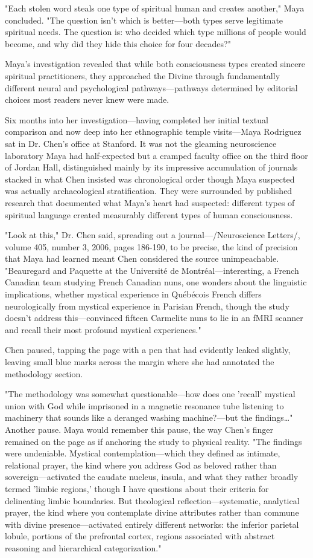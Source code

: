 \documentclass[12pt,twoside]{book}
\begin{document}
"Each stolen word steals one type of spiritual human and creates another," Maya concluded. "The question isn't which is better—both types serve legitimate spiritual needs. The question is: who decided which type millions of people would become, and why did they hide this choice for four decades?"

Maya's investigation revealed that while both consciousness types created sincere spiritual practitioners, they approached the Divine through fundamentally different neural and psychological pathways—pathways determined by editorial choices most readers never knew were made.

Six months into her investigation—having completed her initial textual comparison and now deep into her ethnographic temple visits—Maya Rodriguez sat in Dr. Chen's office at Stanford. It was not the gleaming neuroscience laboratory Maya had half-expected but a cramped faculty office on the third floor of Jordan Hall, distinguished mainly by its impressive accumulation of journals stacked in what Chen insisted was chronological order though Maya suspected was actually archaeological stratification. They were surrounded by published research that documented what Maya's heart had suspected: different types of spiritual language created measurably different types of human consciousness.

"Look at this," Dr. Chen said, spreading out a journal—/Neuroscience Letters/, volume 405, number 3, 2006, pages 186-190, to be precise, the kind of precision that Maya had learned meant Chen considered the source unimpeachable. "Beauregard and Paquette at the Université de Montréal—interesting, a French Canadian team studying French Canadian nuns, one wonders about the linguistic implications, whether mystical experience in Québécois French differs neurologically from mystical experience in Parisian French, though the study doesn't address this—convinced fifteen Carmelite nuns to lie in an fMRI scanner and recall their most profound mystical experiences."

Chen paused, tapping the page with a pen that had evidently leaked slightly, leaving small blue marks across the margin where she had annotated the methodology section.

"The methodology was somewhat questionable—how does one 'recall' mystical union with God while imprisoned in a magnetic resonance tube listening to machinery that sounds like a deranged washing machine?—but the findings\ldots{}" Another pause. Maya would remember this pause, the way Chen's finger remained on the page as if anchoring the study to physical reality. "The findings were undeniable. Mystical contemplation—which they defined as intimate, relational prayer, the kind where you address God as beloved rather than sovereign—activated the caudate nucleus, insula, and what they rather broadly termed 'limbic regions,' though I have questions about their criteria for delineating limbic boundaries. But theological reflection—systematic, analytical prayer, the kind where you contemplate divine attributes rather than commune with divine presence—activated entirely different networks: the inferior parietal lobule, portions of the prefrontal cortex, regions associated with abstract reasoning and hierarchical categorization."
\end{document}
